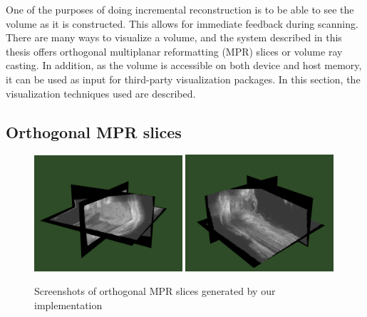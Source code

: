 One of the purposes of doing incremental reconstruction is to be able to see the volume as it is constructed. This allows for immediate feedback during scanning. There are many ways to visualize a volume, and the system described in this thesis offers orthogonal multiplanar reformatting (MPR) slices or volume ray casting. In addition, as the volume is accessible on both device and host memory, it can be used as input for third-party visualization packages. In this section, the visualization techniques used are described.

\subsection{Orthogonal MPR slices}

\begin{figure}[h]
\centering
\includegraphics[width=0.49\textwidth]{graphics/orthogonal_screen0.png}
\includegraphics[width=0.49\textwidth]{graphics/orthogonal_screen1.png}
\caption[Screenshots of orthogonal MPR slices]{Screenshots of orthogonal MPR slices generated by our implementation}
\label{fig:orthogonal_screens}
\end{figure}


